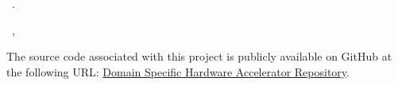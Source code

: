 \null\vfill\small
\content
\noindent\thejournal \ \thejournalsubtitle. \\ \par
\noindent\doclicenseIcon \ \theseason , \theyear \\ \par 
\noindent  The source code associated with this project is publicly available on GitHub at the following URL: \href{https://github.com/Sooryakiran/Domain-Specific-Hardware-Accelerator-VLSI-CAD-Project}{ \color{RubineRed} Domain Specific Hardware Accelerator Repository}.
\newpage